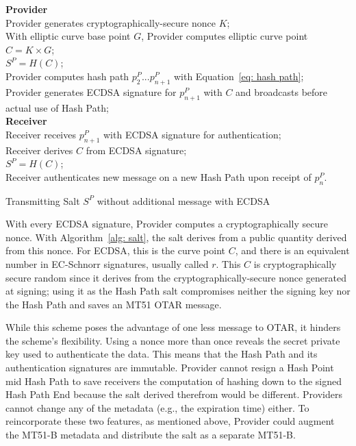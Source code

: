 \documentclass[letterpaper,times]{IONconf/IONconf}
\begin{document}
			\begin{algorithm}%
				\SetAlgoLined
				{\bf Provider} \\
				Provider generates cryptographically-secure nonce $K$; \\
				With elliptic curve base point $G$, Provider computes elliptic curve point $C = K \times G$; \\
				$S^P = H(C)$; \\
				Provider computes hash path $p^P_2 ... p^P_{n+1}$ with Equation~\eqref{eq: hash path}; \\
				Provider generates ECDSA signature for $p^P_{n+1}$ with $C$ and broadcasts before actual use of Hash Path; \\
				{\bf Receiver} \\
				Receiver receives $p^P_{n+1}$ with ECDSA signature for authentication; \\
				Receiver derives $C$ from ECDSA signature; \\
				$S^P = H(C)$; \\
				Receiver authenticates new message on a new Hash Path upon receipt of $p^P_n$.
				\caption{Transmitting Salt $S^P$ without additional message with ECDSA}
				\label{alg: salt}
			\end{algorithm}

			With every ECDSA signature, Provider computes a cryptographically secure nonce.
			With Algorithm~\ref{alg: salt}, the salt derives from a public quantity derived from this nonce.
			For ECDSA, this is the curve point $C$, and there is an equivalent number in EC-Schnorr signatures, usually called $r$.
			This $C$ is cryptographically secure random since it derives from the cryptographically-secure nonce generated at signing; using it as the Hash Path salt compromises neither the signing key nor the Hash Path and saves an MT51 OTAR message.

			While this scheme poses the advantage of one less message to OTAR, it hinders the scheme's flexibility.
			Using a nonce more than once reveals the secret private key used to authenticate the data.
			This means that the Hash Path and its authentication signatures are immutable.
			Provider cannot resign a Hash Point mid Hash Path to save receivers the computation of hashing down to the signed Hash Path End because the salt derived therefrom would be different.
			Providers cannot change any of the metadata (e.g., the expiration time) either.
			To reincorporate these two features, as mentioned above, Provider could augment the MT51-B metadata and distribute the salt as a separate MT51-B.
\end{document}
